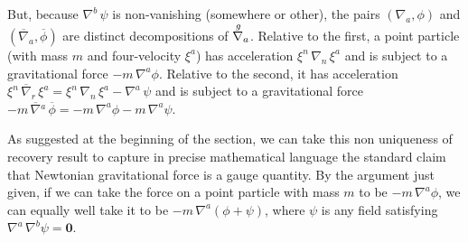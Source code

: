 \documentclass [12] {article}
\theoremstyle{plain}
\numberwithin{figure}{subsection}
\numberwithin{proposition}{subsection}
\begin{document}
\vspace{.5em}

But, because $\nabla^b \, \psi$ is  non-vanishing (somewhere or other), the pairs $(\nabla_a, \phi)$ and  $(\overline{\nabla}_a, \overline{\phi})$ are distinct decompositions of $\stackrel{g \hspace{.4em}}{\nabla_a}$.   Relative to the first,  a point particle (with mass $m$  and four-velocity $\xi^a$) has acceleration $\xi^n \, \nabla_n \, \xi^a$ and is subject to a gravitational force $-m \, \nabla^a  \phi$.  Relative to the second, it has  acceleration $\xi^n \, \overline{\nabla}_r \, \xi^a = \xi^n \, \nabla_n  \, \xi^a - \nabla^a \, \psi$ and is subject to a gravitational force  $-m \, \overline{\nabla}{}^a \, \overline{\phi} = -m \, \nabla^a  \phi - m \, \nabla^a  \psi$.%

As suggested at the beginning of the section, we can take this non uniqueness of recovery result to capture in precise mathematical language the standard claim that Newtonian gravitational force is a gauge quantity.  By the argument just given, if we can take the force on a point particle with mass $m$ to be  $-m \, \nabla^a  \phi$, we can equally well take it to be $-m \, \nabla^a  (\phi  +  \psi)$, where $\psi$ is any field satisfying $\nabla^a \, \nabla^b \psi = \mathbf{0}$.







\end{document}
